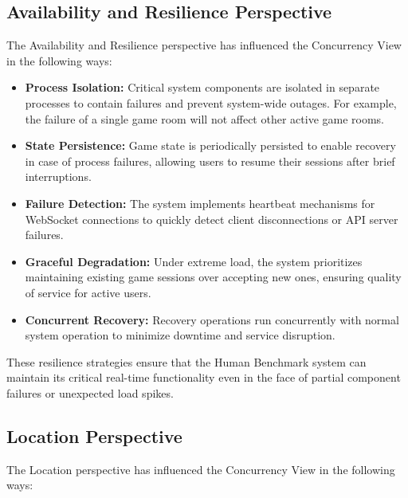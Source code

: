 \subsection{Availability and Resilience Perspective}

The Availability and Resilience perspective has influenced the Concurrency View in the following ways:

\begin{itemize}
    \item \textbf{Process Isolation:} Critical system components are isolated in separate processes to contain failures and prevent system-wide outages. For example, the failure of a single game room will not affect other active game rooms.
    
    \item \textbf{State Persistence:} Game state is periodically persisted to enable recovery in case of process failures, allowing users to resume their sessions after brief interruptions.
    
    \item \textbf{Failure Detection:} The system implements heartbeat mechanisms for WebSocket connections to quickly detect client disconnections or API server failures.
    
    \item \textbf{Graceful Degradation:} Under extreme load, the system prioritizes maintaining existing game sessions over accepting new ones, ensuring quality of service for active users.
    
    \item \textbf{Concurrent Recovery:} Recovery operations run concurrently with normal system operation to minimize downtime and service disruption.
\end{itemize}

These resilience strategies ensure that the Human Benchmark system can maintain its critical real-time functionality even in the face of partial component failures or unexpected load spikes.

\subsection{Location Perspective}

The Location perspective has influenced the Concurrency View in the following ways:

